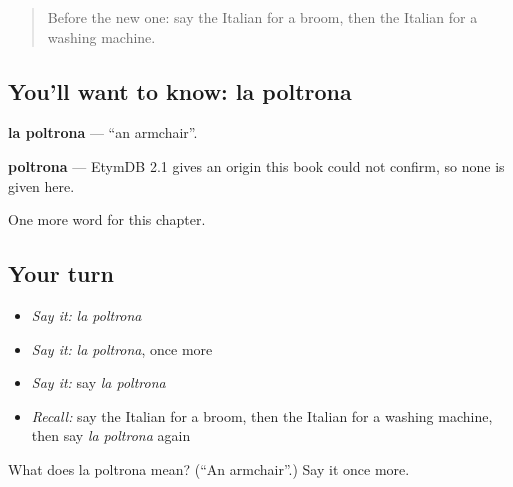 \begin{quote}
Before the new one: say the Italian for a broom, then the Italian for a washing machine.
\end{quote}

\subsection*{You'll want to know: la poltrona}
\textbf{la poltrona} — \textquotedblleft{}an armchair\textquotedblright{}.

\begin{cousinweb}
\textbf{poltrona} — EtymDB 2.1 gives an origin this book could not confirm, so none is given here.
\end{cousinweb}

\begin{grammarlens}[title={What you've built}]
One more word for this chapter.
\end{grammarlens}

\subsection*{Your turn}
\begin{itemize}
\raggedright
  \item \emph{Say it:} \emph{la poltrona}
  \item \emph{Say it:} \emph{la poltrona}, once more
  \item \emph{Say it:} say \emph{la poltrona}
  \item \emph{Recall:} say the Italian for a broom, then the Italian for a washing machine, then say \emph{la poltrona} again
\end{itemize}

\begin{tcolorbox}[breakable,colback=teal!4,colframe=teal!35!black,title={Before you move on}]
What does la poltrona mean? (\textquotedblleft{}An armchair\textquotedblright{}.) Say it once more.
\end{tcolorbox}
